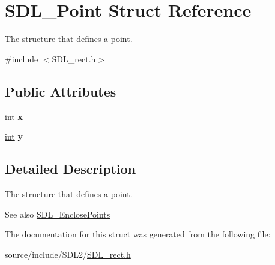 \hypertarget{struct_s_d_l___point}{}\section{S\+D\+L\+\_\+\+Point Struct Reference}
\label{struct_s_d_l___point}


The structure that defines a point.  




{\ttfamily \#include $<$S\+D\+L\+\_\+rect.\+h$>$}

\subsection*{Public Attributes}
\begin{DoxyCompactItemize}
\item 
\hypertarget{struct_s_d_l___point_a2ee987d59888024771c8d83aec43056c}{}\hyperlink{_s_d_l__thread_8h_a6a64f9be4433e4de6e2f2f548cf3c08e}{int} {\bfseries x}\label{struct_s_d_l___point_a2ee987d59888024771c8d83aec43056c}

\item 
\hypertarget{struct_s_d_l___point_aaa68aefa869f6bdf46367a70bd9414b0}{}\hyperlink{_s_d_l__thread_8h_a6a64f9be4433e4de6e2f2f548cf3c08e}{int} {\bfseries y}\label{struct_s_d_l___point_aaa68aefa869f6bdf46367a70bd9414b0}

\end{DoxyCompactItemize}


\subsection{Detailed Description}
The structure that defines a point. 

\begin{DoxySeeAlso}{See also}
\hyperlink{_s_d_l__rect_8h_afcbb58dbba760b9e6fdb4b5d1ece015c}{S\+D\+L\+\_\+\+Enclose\+Points} 
\end{DoxySeeAlso}


The documentation for this struct was generated from the following file\+:\begin{DoxyCompactItemize}
\item 
source/include/\+S\+D\+L2/\hyperlink{_s_d_l__rect_8h}{S\+D\+L\+\_\+rect.\+h}\end{DoxyCompactItemize}
